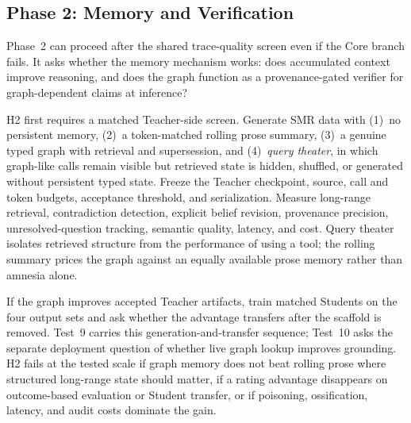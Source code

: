 \subsection{Phase 2: Memory and Verification}

Phase~2 can proceed after the shared trace-quality screen even if the Core
branch fails. It asks whether the memory mechanism works: does accumulated context
improve reasoning, and does the graph function as a provenance-gated
verifier for graph-dependent claims at inference?

H2 first requires a matched Teacher-side screen. Generate SMR data with (1)~no
persistent memory, (2)~a token-matched rolling prose summary, (3)~a genuine typed
graph with retrieval and supersession, and (4)~\emph{query theater}, in which
graph-like calls remain visible but retrieved state is hidden, shuffled, or
generated without persistent typed state. Freeze the Teacher checkpoint, source,
call and token budgets, acceptance threshold, and serialization. Measure
long-range retrieval, contradiction detection, explicit belief revision,
provenance precision, unresolved-question tracking, semantic quality, latency,
and cost. Query theater isolates retrieved structure from the performance of
using a tool; the rolling summary prices the graph against an equally available
prose memory rather than amnesia alone.

If the graph improves accepted Teacher artifacts, train matched Students on the
four output sets and ask whether the advantage transfers after the scaffold is
removed. Test~9 carries this generation-and-transfer sequence; Test~10 asks the
separate deployment question of whether live graph lookup improves grounding.
H2 fails at the tested scale if graph memory does not beat rolling prose where
structured long-range state should matter, if a rating advantage disappears on
outcome-based evaluation or Student transfer, or if poisoning, ossification,
latency, and audit costs dominate the gain.

